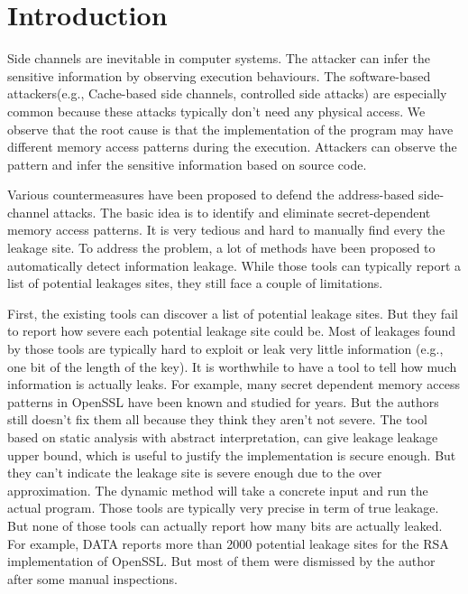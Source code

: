 \section{Introduction}

Side channels are inevitable in computer systems. The attacker can infer the sensitive 
information by observing execution behaviours. The software-based attackers(e.g., Cache-based 
side channels, controlled side attacks) are especially common because these attacks typically 
don’t need any physical access. We observe that the root cause is that the implementation of 
the program may have different memory access patterns during the execution. Attackers can 
observe the pattern and infer the sensitive information based on source code.

Various countermeasures have been proposed to defend the address-based side-channel attacks. 
The basic idea is to identify and eliminate secret-dependent memory access patterns. 
It is very tedious and hard to manually find every the leakage site. To address the problem, 
a lot of methods have been proposed to automatically detect information leakage. 
While those tools can typically report a list of potential leakages sites, they still 
face a couple of limitations.

First, the existing tools \cite{203878} \cite{217537} can discover a list of potential leakage sites. 
But they fail to report how severe each potential leakage site could be. Most of leakages 
found by those tools are typically hard to exploit or leak very little information (e.g., one bit of
the length of the key).  It is worthwhile to have a tool to tell how much information is actually leaks. 
For example, many secret dependent memory access patterns in OpenSSL have been known 
and studied for years. But the authors still doesn’t fix them all because they think 
they aren’t not severe. The tool based on static analysis with abstract interpretation, 
can give leakage leakage upper bound, which is useful to justify the implementation is 
secure enough. But they can’t indicate the leakage site is severe enough due to the over 
approximation. The dynamic method will take a concrete input and run the actual program. 
Those tools are typically very precise in term of true leakage. But none of those tools 
can actually report how many bits are actually leaked. For example, DATA reports more 
than 2000 potential leakage sites for the RSA implementation of OpenSSL. But most of 
them were dismissed by the author after some manual inspections.

